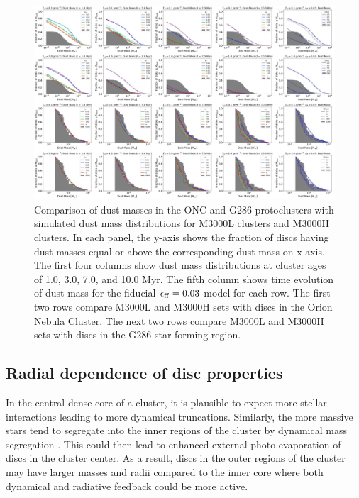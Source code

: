 \documentclass[fleqn,usenatbib]{mnras}
\newcommand\sfeff{\ensuremath{\epsilon_{\rm ff}}\xspace}   %
\begin{document}
\begin{figure}
    \includegraphics[width=\textwidth]{figures/PanelFracDustMass_5panel.pdf}
    \caption{Comparison of dust masses in the ONC and G286 protoclusters with simulated dust mass distributions for M3000L clusters and M3000H clusters. In each panel, the y-axis shows the fraction of discs having dust masses equal or above the corresponding dust mass on x-axis. The first four columns show dust mass distributions at cluster ages of 1.0, 3.0, 7.0, and 10.0 Myr. The fifth column shows time evolution of dust mass for the fiducial $\sfeff = 0.03$ model for each row. The first two rows compare M3000L and M3000H sets with discs in the Orion Nebula Cluster. The next two rows compare M3000L and M3000H sets with discs in the G286 star-forming region.}
    \label{fig:dustmass_observations_comparison}
\end{figure}

\subsection{Radial dependence of disc properties}
\label{subsec:radialdependence-results}

In the central dense core of a cluster, it is plausible to expect more stellar interactions leading to more dynamical truncations. Similarly, the more massive stars tend to segregate into the inner regions of the cluster by dynamical mass segregation \citep{Allison2009ApJ...700L..99A,Dominguez2017MNRAS.472..465D}. This could then lead to enhanced external photo-evaporation of discs in the cluster center. As a result, discs in the outer regions of the cluster may have larger masses and radii compared to the inner core where both dynamical and radiative feedback could be more active.
\end{document}
